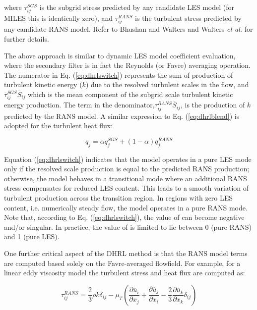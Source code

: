 where $\tau^{SGS}_{ij}$ is the subgrid stress predicted by any
candidate LES model (for MILES this is identically zero), and
$\tau^{RANS}_{ij}$ is the turbulent stress predicted by any candidate
RANS model. Refer to Bhushan and Walters\cite{Bhushan.2012} and Walters
{\it et al.} \cite{Walters.2013} for further details.

The above approach is similar to dynamic LES model coefficient
evaluation, where the secondary filter is in fact the Reynolds (or
Favre) averaging operation. The numerator in Eq. (\ref{eq:dhrlswitch})
represents the sum of production of turbulent kinetic energy ($k$) due
to the resolved turbulent scales in the flow, and
$\overline{\tau}^{SGS}_{ij} \overline{S}_{ij}$ which is the mean
component of the subgrid scale turbulent kinetic energy
production. The term in the denominator,$\tau^{RANS}_{ij}
\overline{S}_{ij}$, is the production of $k$ predicted by the RANS
model. A similar expression to Eq. (\ref{eq:dhrlblend}) is adopted for
the turbulent heat flux:

\begin{equation}
q_j = \alpha q^{SGS}_j + (1-\alpha) q^{RANS}_j
\end{equation}

Equation (\ref{eq:dhrlswitch}) indicates that the model operates in a
pure LES mode only if the resolved scale production is equal to the
predicted RANS production; otherwise, the model behaves in a
transitional mode where an additional RANS stress compensates for
reduced LES content. This leads to a smooth variation of turbulent
production across the transition region. In regions with zero LES
content, i.e. numerically steady flow, the model operates in a pure
RANS mode. Note that, according to Eq. (\ref{eq:dhrlswitch}), the
value of can become negative and/or singular. In practice, the value
of is limited to lie between 0 (pure RANS) and 1 (pure LES).

One further critical aspect of the DHRL method is that the RANS model
terms are computed based solely on the Favre-averaged flowfield. For
example, for a linear eddy viscosity model the turbulent stress and
heat flux are computed as:

\begin{equation}
\tau^{RANS}_{ij} = \frac{2}{3} \rho k \delta_{ij} - \mu_T \left( \frac{\partial \overline{u}_i}{\partial x_j} + \frac{\partial \overline{u}_j}{\partial x_i} - \frac{2}{3} \frac{\partial \overline{u}_k}{\partial x_k} \delta_{ij}\right)
\end{equation}

